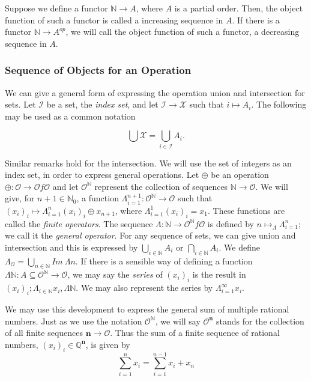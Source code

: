 \documentclass [12pt]{book}
\begin{document}
Suppose we define a functor $\mathbb{N}\rightarrow A$, where $A$ is a partial order. Then, the object function of such a functor is called a increasing sequence in $A$. If there is a functor $\mathbb{N}\rightarrow A^{op}$, we will call the object function of such a functor, a decreasing sequence in $A$.

		\subsubsection{Sequence of Objects for an Operation}
 
We can give a general form of expressing the operation union and intersection for sets. Let $\mathcal{I}$ be a set, the \textit{index set}, and let $\mathcal{I}\rightarrow\mathcal{X}$ such that $i\mapsto A_i$. The following may be used as a common notation

$$\bigcup\mathcal{X}=\bigcup_{i\in\mathcal{I}}A_i.$$

Similar remarks hold for the intersection. We will use the set of integers as an index set, in order to express general operations. Let $\oplus$ be an operation $\oplus:\mathcal{O}\rightarrow\mathcal{O}f\mathcal{O}$ and let $\mathcal{O}^\mathbb{N}$ represent the collection of sequences 
$\mathbb{N}\rightarrow\mathcal{O}$. We will give, for $n+1\in\mathbb{N}_0$, a function $\Lambda_{i=1}^{n+1}:\mathcal{O}^\mathbb{N}\rightarrow\mathcal{O}$ such that $(x_i)_i\mapsto\Lambda_{i=1}^{n}(x_i)_i\oplus x_{n+1}$, where $\Lambda_{i=1}^1(x_i)_i=x_1$. These functions are called the \textit{finite operators}. The sequence $\Lambda:\mathbb{N}\rightarrow\mathcal{O}^\mathbb{N}f\mathcal{O}$ is defined by $n\mapsto_{\Lambda}\Lambda_{i=1}^n$; we call it the \textit{general operator}. For any sequence of sets, we can give union and intersection and this is expressed by $\bigcup_{i\in\mathbb{N}}A_i$ or $\bigcap_{i\in\mathbb{N}}A_i$. We define $\Lambda_\mathcal{O}=\bigcup_{n\in\mathbb{N}}Im~\Lambda n$. If there is a sensible way of defining a function $\Lambda\mathbb N:A\subseteq\mathcal O^\mathbb N\rightarrow\mathcal O$, we may say the \textit{series} of $(x_i)_i$ is the result in $(x_{i})_i;\Lambda_{i\in\mathbb N}x_i,\Lambda\mathbb N$. We may also represent the series by $\Lambda_{i=1}^\infty x_i$.

We may use this development to express the general sum of multiple rational numbers. Just as we use the notation $\mathcal{O}^{\mathbb{N}}$, we will say $\mathcal{O}^{\textbf{n}}$ stands for the collection of all finite sequences $\textbf{n}\rightarrow\mathcal{O}$. Thus the sum of a finite sequence of rational numbers, $(x_i)_i\in\mathbb{Q}^\textbf{n}$, is given by $$\sum_{i=1}^nx_i=\sum_{i=1}^{n-1}x_i+x_n$$
\end{document}
